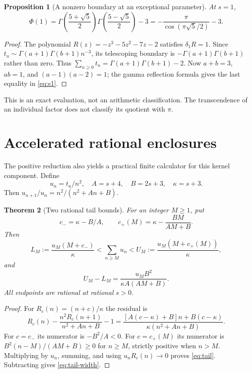 \documentclass[11pt]{article}
\newtheorem{theorem}{Theorem}[section]
\newtheorem{proposition}[theorem]{Proposition}
\theoremstyle{remark}
\begin{document}
\begin{proposition}[A nonzero boundary at an exceptional parameter]
At $s=1$,
\begin{equation}\label{eq:s1}
 \Phi(1)=\Gamma\!\left(\frac{5+\sqrt5}{2}\right)
              \Gamma\!\left(\frac{5-\sqrt5}{2}\right)-3
        =-\frac{\pi}{\cos(\pi\sqrt5/2)}-3.
\end{equation}
\end{proposition}
\begin{proof}
The polynomial $R(z)=-z^3-5z^2-7z-2$ satisfies $\delta_1R=1$.
Since $t_n\sim\Gamma(a+1)\Gamma(b+1)n^{-3}$, its telescoping boundary
is $-\Gamma(a+1)\Gamma(b+1)$ rather than zero. Thus
$\sum_{n\ge0}t_n=\Gamma(a+1)\Gamma(b+1)-2$.
Now $a+b=3$, $ab=1$, and $(a-1)(a-2)=1$; the gamma reflection
formula gives the last equality in \eqref{eq:s1}.
\end{proof}
This is an exact evaluation, not an arithmetic classification. The
transcendence of an individual factor does not classify its quotient
with $\pi$.

\section{Accelerated rational enclosures}

The positive reduction also yields a practical finite calculator for
this kernel component. Define
\[
 u_n=t_n/n^2,\quad A=s+4,\quad B=2s+3,\quad \kappa=s+3.
\]
Then $u_{n+1}/u_n=n^2/(n^2+An+B)$.

\begin{theorem}[Two rational tail bounds]\label{thm:tail}
For an integer $M\ge1$, put
\[
 c_-=\kappa-B/A,\qquad
 c_+(M)=\kappa-\frac{BM}{AM+B}.
\]
Then
\begin{equation}\label{eq:tail}
 L_M:=\frac{u_M(M+c_-)}{\kappa}
 <\sum_{n\ge M}u_n<
 U_M:=\frac{u_M(M+c_+(M))}{\kappa},
\end{equation}
and
\begin{equation}\label{eq:tail-width}
 U_M-L_M=\frac{u_MB^2}{\kappa A(AM+B)}.
\end{equation}
All endpoints are rational at rational $s>0$.
\end{theorem}
\begin{proof}
For $R_c(n)=(n+c)/\kappa$ the residual is
\[
 R_c(n)-\frac{n^2R_c(n+1)}{n^2+An+B}-1
 =\frac{[A(c-\kappa)+B]n+B(c-\kappa)}
        {\kappa(n^2+An+B)}.
\]
For $c=c_-$ its numerator is $-B^2/A<0$. For $c=c_+(M)$ its
numerator is $B^2(n-M)/(AM+B)\ge0$ for $n\ge M$, strictly positive
when $n>M$. Multiplying by $u_n$, summing, and using $u_nR_c(n)\to0$
proves \eqref{eq:tail}. Subtracting gives \eqref{eq:tail-width}.
\end{proof}
\end{document}
